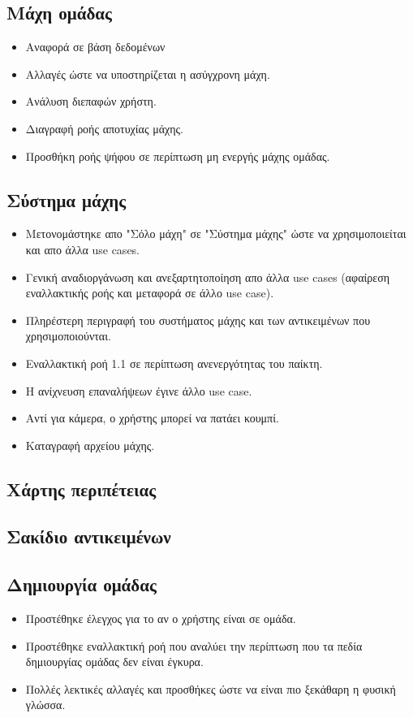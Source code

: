 \subsection{Μάχη ομάδας}
\begin{itemize}
    \item Αναφορά σε βάση δεδομένων
    \item Αλλαγές ώστε να υποστηρίζεται η ασύγχρονη μάχη.
    \item Ανάλυση διεπαφών χρήστη.
    \item Διαγραφή ροής αποτυχίας μάχης.
    \item Προσθήκη ροής ψήφου σε περίπτωση μη ενεργής μάχης ομάδας.
\end{itemize}
\subsection{Σύστημα μάχης}
\begin{itemize}
    \item Μετονομάστηκε απο "Σόλο μάχη" σε "Σύστημα μάχης" ώστε να χρησιμοποιείται και απο άλλα use cases.
    \item Γενική αναδιοργάνωση και ανεξαρτητοποίηση απο άλλα use cases (αφαίρεση εναλλακτικής ροής και μεταφορά σε άλλο use case).
    \item Πληρέστερη περιγραφή του συστήματος μάχης και των αντικειμένων που χρησιμοποιούνται.
    \item Εναλλακτική ροή 1.1 σε περίπτωση ανενεργότητας του παίκτη.
	\item Η ανίχνευση επαναλήψεων έγινε άλλο use case.
	\item Αντί για κάμερα, ο χρήστης μπορεί να πατάει κουμπί.
	\item Καταγραφή αρχείου μάχης.
\end{itemize}
\subsection{Χάρτης περιπέτειας}
\subsection{Σακίδιο αντικειμένων}
\subsection{Δημιουργία ομάδας}
\begin{itemize}
    \item Προστέθηκε έλεγχος για το αν ο χρήστης είναι σε ομάδα.
    \item Προστέθηκε εναλλακτική ροή που αναλύει την περίπτωση που τα πεδία δημιουργίας ομάδας δεν είναι έγκυρα.
    \item Πολλές λεκτικές αλλαγές και προσθήκες ώστε να είναι πιο ξεκάθαρη η φυσική γλώσσα.
\end{itemize}
